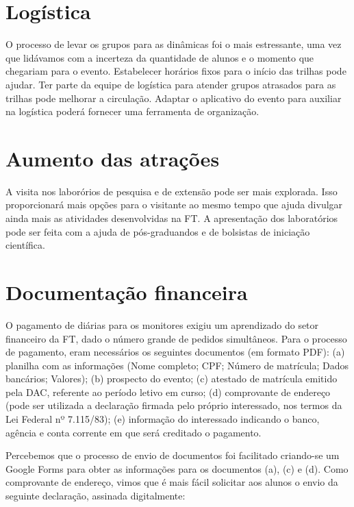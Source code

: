 \documentclass[
  letterpaper,
  DIV=11,
  numbers=noendperiod]{scrreprt}
\begin{document}
\section{Logística}\label{loguxedstica}

O processo de levar os grupos para as dinâmicas foi o mais estressante,
uma vez que lidávamos com a incerteza da quantidade de alunos e o
momento que chegariam para o evento. Estabelecer horários fixos para o
início das trilhas pode ajudar. Ter parte da equipe de logística para
atender grupos atrasados para as trilhas pode melhorar a circulação.
Adaptar o aplicativo do evento para auxiliar na logística poderá
fornecer uma ferramenta de organização.

\section{Aumento das atrações}\label{aumento-das-atrauxe7uxf5es}

A visita nos laborórios de pesquisa e de extensão pode ser mais
explorada. Isso proporcionará mais opções para o visitante ao mesmo
tempo que ajuda divulgar ainda mais as atividades desenvolvidas na FT. A
apresentação dos laboratórios pode ser feita com a ajuda de
pós-graduandos e de bolsistas de iniciação científica.

\section{Documentação financeira}\label{documentauxe7uxe3o-financeira}

O pagamento de diárias para os monitores exigiu um aprendizado do setor
financeiro da FT, dado o número grande de pedidos simultâneos. Para o
processo de pagamento, eram necessários os seguintes documentos (em
formato PDF): (a) planilha com as informações (Nome completo; CPF;
Número de matrícula; Dados bancários; Valores); (b) prospecto do evento;
(c) atestado de matrícula emitido pela DAC, referente ao período letivo
em curso; (d) comprovante de endereço (pode ser utilizada a declaração
firmada pelo próprio interessado, nos termos da Lei Federal nº
7.115/83); (e) informação do interessado indicando o banco, agência e
conta corrente em que será creditado o pagamento.

Percebemos que o processo de envio de documentos foi facilitado
criando-se um Google Forms para obter as informações para os documentos
(a), (c) e (d). Como comprovante de endereço, vimos que é mais fácil
solicitar aos alunos o envio da seguinte declaração, assinada
digitalmente:
\end{document}
